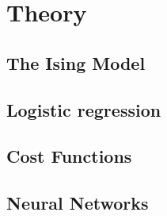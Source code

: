 
\section{Theory}
\subsection{The Ising Model}


\subsection{Logistic regression}


\subsection{Cost Functions}


\subsection{Neural Networks}

